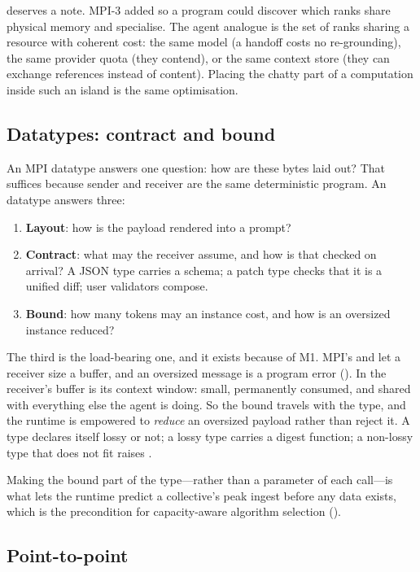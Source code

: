  deserves a note. MPI-3 added
 so a program could discover which ranks share
physical memory and specialise. The agent analogue is the set of ranks
sharing a resource with coherent cost: the same model (a handoff costs no
re-grounding), the same provider quota (they contend), or the same context
store (they can exchange references instead of content). Placing the chatty
part of a computation inside such an island is the same optimisation.

\subsection{Datatypes: contract and bound}

An MPI datatype answers one question: how are these bytes laid out? That
suffices because sender and receiver are the same deterministic program. An
\ampi{} datatype answers three:

\begin{enumerate}
\item \textbf{Layout}: how is the payload rendered into a prompt?
\item \textbf{Contract}: what may the receiver assume, and how is that
checked on arrival? A JSON type carries a schema; a patch type checks that
it is a unified diff; user validators compose.
\item \textbf{Bound}: how many tokens may an instance cost, and how is an
oversized instance reduced?
\end{enumerate}

The third is the load-bearing one, and it exists because of M1. MPI's
 and  let a receiver size a buffer, and an
oversized message is a program error
(). In \ampi{} the receiver's buffer is its context
window: small, permanently consumed, and shared with everything else the
agent is doing. So the bound travels with the type, and the runtime is
empowered to \emph{reduce} an oversized payload rather than reject it. A
type declares itself lossy or not; a lossy type carries a digest function; a
non-lossy type that does not fit raises .

Making the bound part of the type---rather than a parameter of each
call---is what lets the runtime predict a collective's peak ingest before
any data exists, which is the precondition for capacity-aware algorithm
selection ().

\subsection{Point-to-point}
\label{sec:design-p2p}

